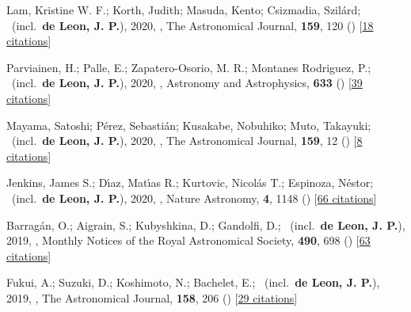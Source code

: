 \item[{\color{numcolor}\scriptsize21}] Lam, Kristine W. F.; Korth, Judith; Masuda, Kento; Csizmadia, Szil{\'a}rd; \etal\ (incl.\ \textbf{de Leon, J. P.}), 2020, , The Astronomical Journal, \textbf{159}, 120 () [\href{https://ui.adsabs.harvard.edu/abs/2020AJ....159..120L}{18 citations}]

\item[{\color{numcolor}\scriptsize20}] Parviainen, H.; Palle, E.; Zapatero-Osorio, M. R.; Montanes Rodriguez, P.; \etal\ (incl.\ \textbf{de Leon, J. P.}), 2020, , Astronomy and Astrophysics, \textbf{633} () [\href{https://ui.adsabs.harvard.edu/abs/2020A&A...633A..28P}{39 citations}]

\item[{\color{numcolor}\scriptsize19}] Mayama, Satoshi; P{\'e}rez, Sebasti{\'a}n; Kusakabe, Nobuhiko; Muto, Takayuki; \etal\ (incl.\ \textbf{de Leon, J. P.}), 2020, , The Astronomical Journal, \textbf{159}, 12 () [\href{https://ui.adsabs.harvard.edu/abs/2020AJ....159...12M}{8 citations}]

\item[{\color{numcolor}\scriptsize18}] Jenkins, James S.; D{\'\i}az, Mat{\'\i}as R.; Kurtovic, Nicol{\'a}s T.; Espinoza, N{\'e}stor; \etal\ (incl.\ \textbf{de Leon, J. P.}), 2020, , Nature Astronomy, \textbf{4}, 1148 () [\href{https://ui.adsabs.harvard.edu/abs/2020NatAs...4.1148J}{66 citations}]

\item[{\color{numcolor}\scriptsize17}] Barrag{\'a}n, O.; Aigrain, S.; Kubyshkina, D.; Gandolfi, D.; \etal\ (incl.\ \textbf{de Leon, J. P.}), 2019, , Monthly Notices of the Royal Astronomical Society, \textbf{490}, 698 () [\href{https://ui.adsabs.harvard.edu/abs/2019MNRAS.490..698B}{63 citations}]

\item[{\color{numcolor}\scriptsize16}] Fukui, A.; Suzuki, D.; Koshimoto, N.; Bachelet, E.; \etal\ (incl.\ \textbf{de Leon, J. P.}), 2019, , The Astronomical Journal, \textbf{158}, 206 () [\href{https://ui.adsabs.harvard.edu/abs/2019AJ....158..206F}{29 citations}]

